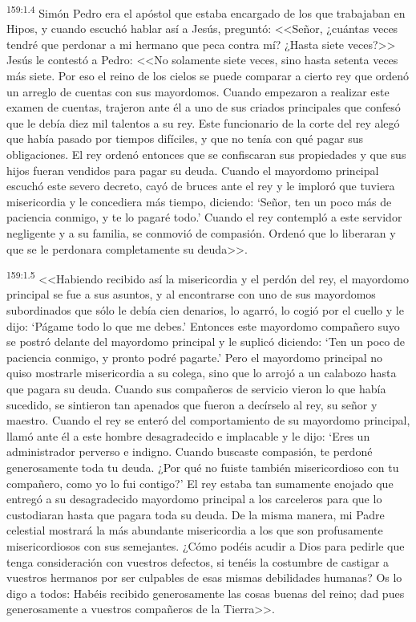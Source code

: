 \par 
\textsuperscript{159:1.4} Simón Pedro era el apóstol que estaba encargado de los que trabajaban en Hipos, y cuando escuchó hablar así a Jesús, preguntó: <<Señor, ¿cuántas veces tendré que perdonar a mi hermano que peca contra mí? ¿Hasta siete veces?>> Jesús le contestó a Pedro: <<No solamente siete veces, sino hasta setenta veces más siete. Por eso el reino de los cielos se puede comparar a cierto rey que ordenó un arreglo de cuentas con sus mayordomos. Cuando empezaron a realizar este examen de cuentas, trajeron ante él a uno de sus criados principales que confesó que le debía diez mil talentos a su rey. Este funcionario de la corte del rey alegó que había pasado por tiempos difíciles, y que no tenía con qué pagar sus obligaciones. El rey ordenó entonces que se confiscaran sus propiedades y que sus hijos fueran vendidos para pagar su deuda. Cuando el mayordomo principal escuchó este severo decreto, cayó de bruces ante el rey y le imploró que tuviera misericordia y le concediera más tiempo, diciendo: `Señor, ten un poco más de paciencia conmigo, y te lo pagaré todo.' Cuando el rey contempló a este servidor negligente y a su familia, se conmovió de compasión. Ordenó que lo liberaran y que se le perdonara completamente su deuda>>.

\par 
\textsuperscript{159:1.5} <<Habiendo recibido así la misericordia y el perdón del rey, el mayordomo principal se fue a sus asuntos, y al encontrarse con uno de sus mayordomos subordinados que sólo le debía cien denarios, lo agarró, lo cogió por el cuello y le dijo: `Págame todo lo que me debes.' Entonces este mayordomo compañero suyo se postró delante del mayordomo principal y le suplicó diciendo: `Ten un poco de paciencia conmigo, y pronto podré pagarte.' Pero el mayordomo principal no quiso mostrarle misericordia a su colega, sino que lo arrojó a un calabozo hasta que pagara su deuda. Cuando sus compañeros de servicio vieron lo que había sucedido, se sintieron tan apenados que fueron a decírselo al rey, su señor y maestro. Cuando el rey se enteró del comportamiento de su mayordomo principal, llamó ante él a este hombre desagradecido e implacable y le dijo: `Eres un administrador perverso e indigno. Cuando buscaste compasión, te perdoné generosamente toda tu deuda. ¿Por qué no fuiste también misericordioso con tu compañero, como yo lo fui contigo?' El rey estaba tan sumamente enojado que entregó a su desagradecido mayordomo principal a los carceleros para que lo custodiaran hasta que pagara toda su deuda. De la misma manera, mi Padre celestial mostrará la más abundante misericordia a los que son profusamente misericordiosos con sus semejantes. ¿Cómo podéis acudir a Dios para pedirle que tenga consideración con vuestros defectos, si tenéis la costumbre de castigar a vuestros hermanos por ser culpables de esas mismas debilidades humanas? Os lo digo a todos: Habéis recibido generosamente las cosas buenas del reino; dad pues generosamente a vuestros compañeros de la Tierra>>.


